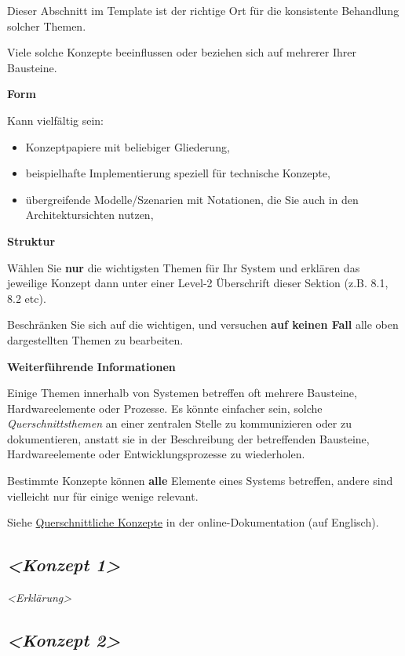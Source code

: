 \documentclass[a4paper,12pt]{article}
\begin{document}
Dieser Abschnitt im Template ist der richtige Ort für die konsistente
Behandlung solcher Themen.

Viele solche Konzepte beeinflussen oder beziehen sich auf mehrerer Ihrer
Bausteine.

\textbf{Form}

Kann vielfältig sein:

\begin{itemize}
\item
  Konzeptpapiere mit beliebiger Gliederung,
\item
  beispielhafte Implementierung speziell für technische Konzepte,
\item
  übergreifende Modelle/Szenarien mit Notationen, die Sie auch in den
  Architektursichten nutzen,
\end{itemize}

\textbf{Struktur}

Wählen Sie \textbf{nur} die wichtigsten Themen für Ihr System und
erklären das jeweilige Konzept dann unter einer Level-2 Überschrift
dieser Sektion (z.B. 8.1, 8.2 etc).

Beschränken Sie sich auf die wichtigen, und versuchen \textbf{auf keinen
Fall} alle oben dargestellten Themen zu bearbeiten.

\textbf{Weiterführende Informationen}

Einige Themen innerhalb von Systemen betreffen oft mehrere Bausteine,
Hardwareelemente oder Prozesse. Es könnte einfacher sein, solche
\emph{Querschnittsthemen} an einer zentralen Stelle zu kommunizieren
oder zu dokumentieren, anstatt sie in der Beschreibung der betreffenden
Bausteine, Hardwareelemente oder Entwicklungsprozesse zu wiederholen.

Bestimmte Konzepte können \textbf{alle} Elemente eines Systems
betreffen, andere sind vielleicht nur für einige wenige relevant.

Siehe \href{https://docs.arc42.org/section-8/}{Querschnittliche
Konzepte} in der online-Dokumentation (auf Englisch).

\subsection{\texorpdfstring{\emph{\textless Konzept
1\textgreater{}}}{\textless Konzept 1\textgreater{}}}\label{_konzept_1}

\emph{\textless Erklärung\textgreater{}}

\subsection{\texorpdfstring{\emph{\textless Konzept
2\textgreater{}}}{\textless Konzept 2\textgreater{}}}\label{_konzept_2}
\end{document}
